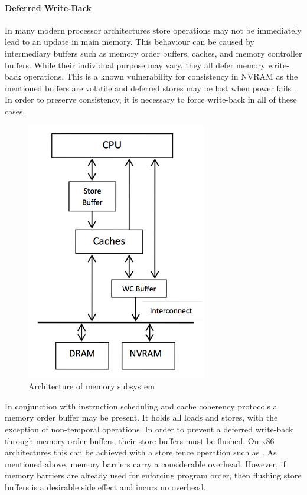 \paragraph{Deferred Write-Back}

In many modern processor architectures store operations may not  be immediately
lead to an update in main memory. This behaviour can be caused by intermediary
buffers such as memory order buffers, caches, and memory controller buffers.
While their individual purpose may vary, they all defer memory write-back
operations. This is a known vulnerability for consistency in NVRAM as the
mentioned buffers are volatile and deferred stores may be lost when power fails
\cite{condit2009better, oukid2017data}. In order to preserve consistency, it is
necessary to force write-back in all of these cases.

\begin{figure}[!ht]
    \centering
    \includegraphics[scale=0.75]{figures/nvram-memory-subsystem.pdf}
    \caption{Architecture of memory subsystem \cite{bhandari2012implications}}
    \label{fig:nvml}
\end{figure}


In conjunction with instruction scheduling and cache coherency protocols a
memory order buffer may be present. It holds all loads and stores, with the
exception of non-temporal operations. In order to prevent a deferred write-back
through memory order buffers, their store buffers must be flushed. On x86
architectures this can be achieved with a store fence operation such as
. As mentioned above, memory barriers carry a considerable
overhead. However, if memory barriers are already used for enforcing program
order, then flushing store buffers is a desirable side effect and incurs no
overhead.

